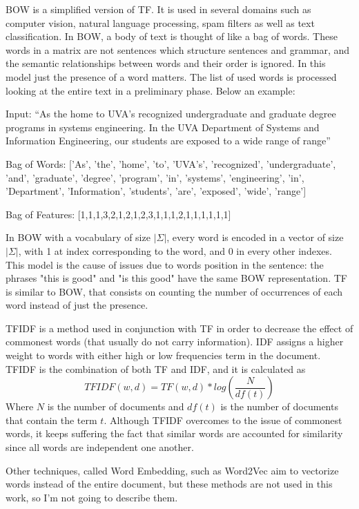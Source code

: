 \begin{description}
	\item \ac{BOW} is a simplified version of \ac{TF}. It is used in several domains such as computer vision, natural language processing, spam filters as well as text classification. In \ac{BOW}, a body of text is thought of like a bag of words. These words in a matrix are not sentences which structure sentences and grammar, and the semantic relationships between words and their order is ignored. In this model just the presence of a word matters. The list of used words is processed looking at the entire text in a preliminary phase. Below an example:
	\begin{description}
		\item Input: “As the home to UVA’s recognized undergraduate and graduate degree programs in systems
		engineering. In the UVA Department of Systems and Information Engineering, our students are
		exposed to a wide range of range”
		\item Bag of Words: ['As', 'the', 'home', 'to', 'UVA’s', 'recognized', 'undergraduate', 'and', 'graduate', 'degree', 'program', 'in', 'systems', 'engineering', 'in', 'Department', 'Information', 'students', 'are', 'exposed', 'wide', 'range']
		\item Bag of Features: [1,1,1,3,2,1,2,1,2,3,1,1,1,2,1,1,1,1,1,1]
	\end{description}
	In \ac{BOW} with a vocabulary of size $|\Sigma|$, every word is encoded in a vector of size $|\Sigma|$, with 1 at index corresponding to the word, and 0 in every other indexes. This model is the cause of issues due to words position in the sentence: the phrases "this is good" and "is this good" have the same \ac{BOW} representation. \ac{TF} is similar to \ac{BOW}, that consists on counting the number of occurrences of each word instead of just the presence.
	\item \ac{TFIDF} is a method used in conjunction with \ac{TF} in order to decrease the effect of commonest words (that usually do not carry information). \ac{IDF} assigns a higher weight to words with either high or low frequencies term in the document. \ac{TFIDF} is the combination of both \ac{TF} and \ac{IDF}, and it is calculated as
	\[TFIDF(w,d) = TF(w, d) * log(\frac{N}{df(t)})\]
	Where $N$ is the number of documents and $df(t)$ is the number of documents that contain the term $t$. Although \ac{TFIDF} overcomes to the issue of commonest words, it keeps suffering the fact that similar words are accounted for similarity since all words are independent one another. 
	\item Other techniques, called Word Embedding, such as Word2Vec \cite{NIPS2013_5021} aim to vectorize words instead of the entire document, but these methods are not used in this work, so I'm not going to describe them.
\end{description}


